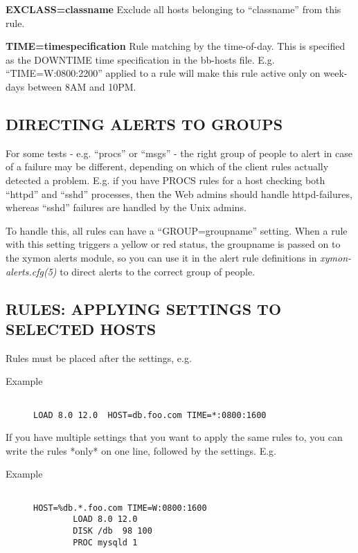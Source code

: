  \textbf{EXCLASS=classname}
 Exclude all hosts belonging to ``classname'' from this rule. 


 \textbf{TIME=timespecification}
 Rule matching by the time-of-day. This is specified as the DOWNTIME time specification in the bb-hosts file. E.g. ``TIME=W:0800:2200'' applied to a rule will make this rule active only on week-days between 8AM and 10PM. 


 
\subsection{DIRECTING ALERTS TO GROUPS}
 For some tests - e.g. ``procs'' or ``msgs'' - the right group of
 people to alert in case of a failure may be different, depending on
 which of the client rules actually detected a problem. E.g. if you
 have PROCS rules for a host checking both ``httpd'' and ``sshd''
 processes, then the Web admins should handle httpd-failures, whereas
 ``sshd'' failures are handled by the Unix admins. 


  To handle this, all rules can have a ``GROUP=groupname'' setting. When a rule with this setting triggers a yellow or red status, the groupname is passed on to the xymon alerts module, so you can use it in the alert rule definitions in \emph{xymon-alerts.cfg(5)}
 to direct alerts to the correct group of people. 



 
\subsection{RULES: APPLYING SETTINGS TO SELECTED HOSTS}
 Rules must be placed after the settings, e.g. \begin{description}
\item[Example]\begin{verbatim}

LOAD 8.0 12.0  HOST=db.foo.com TIME=*:0800:1600

\end{verbatim}


\end{description}



  If you have multiple settings that you want to apply the same rules
  to, you can write the rules *only* on one line, followed by the
  settings. E.g. 

\begin{description}
\item[Example]\begin{verbatim}

HOST=%db.*.foo.com TIME=W:0800:1600
        LOAD 8.0 12.0
        DISK /db  98 100
        PROC mysqld 1

\end{verbatim}


\end{description}




